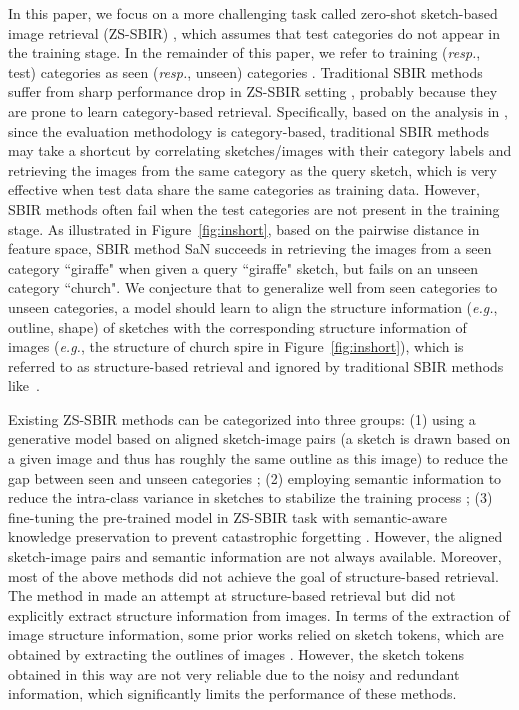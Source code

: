 \documentclass[10pt,twocolumn,letterpaper]{article}
\begin{document}
In this paper, we focus on a more challenging task called zero-shot sketch-based image retrieval (ZS-SBIR) \cite{shen2018zero}, which assumes that test categories do not appear in the training stage. In the remainder of this paper, we refer to training  (\emph{resp.}, test) categories as seen (\emph{resp.}, unseen) categories \cite{dupont2018learning}.
Traditional SBIR methods suffer from sharp performance drop in ZS-SBIR setting \cite{yelamarthi2018zero}, probably because they are prone to learn category-based retrieval.
Specifically, based on the analysis in \cite{yelamarthi2018zero}, since the evaluation methodology is category-based, traditional SBIR methods may take a shortcut by correlating sketches/images with their category labels and retrieving the images from the same category as the query sketch, which is very effective when test data share the same categories as training data. 
However, SBIR methods often fail when the test categories are not present in the training stage. 
As illustrated in Figure~\ref{fig:inshort}, based on the pairwise distance in feature space, SBIR method SaN \cite{yu2017sketch} succeeds in retrieving the images from a seen category ``giraffe" when given a query ``giraffe" sketch, but fails on an unseen category ``church". We conjecture that to generalize well from seen categories to unseen categories, a model should learn to align the structure information (\emph{e.g.}, outline, shape) of sketches with the corresponding structure information of images (\emph{e.g.}, the structure of church spire in Figure~\ref{fig:inshort}), which is referred to as structure-based retrieval and ignored by traditional SBIR methods like~\cite{yu2017sketch}. 

Existing ZS-SBIR methods can be categorized into three groups:
(1) using a generative model based on aligned sketch-image pairs (a sketch is drawn based on a given image and thus has roughly the same outline as this image) to reduce the gap between seen and unseen categories \cite{yelamarthi2018zero}; 
(2) employing semantic information to reduce the intra-class variance in sketches to stabilize the training process \cite{xu2019semantic, wang2019stacked, dutta2019semantically, shen2018zero}; 
(3) fine-tuning the pre-trained model in ZS-SBIR task with semantic-aware knowledge preservation to prevent catastrophic forgetting \cite{liu2019semantic}. 
However, the aligned sketch-image pairs and semantic information are not always available. Moreover, most of the above methods did not achieve the goal of structure-based retrieval. The method in \cite{yelamarthi2018zero} made an attempt at structure-based retrieval but did not explicitly extract structure information from images. 
In terms of the extraction of image structure information, some prior works relied on sketch tokens, which are obtained by extracting the outlines of images \cite{liu2017deep, wang2015sketch, yu2016sketch}. However, the sketch tokens obtained in this way are not very reliable due to the noisy and redundant information, which significantly limits the performance of these methods.
\end{document}
